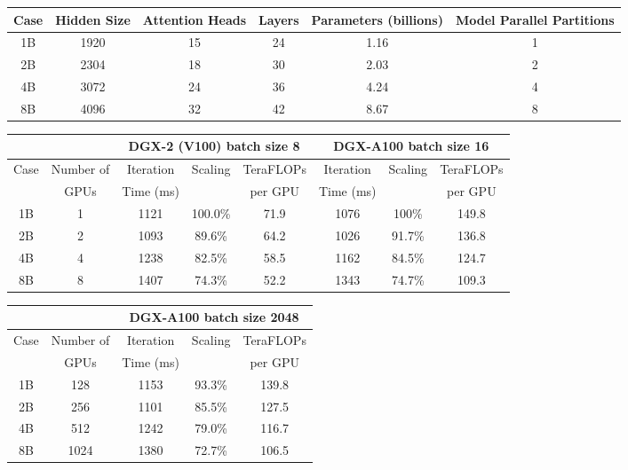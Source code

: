 \documentclass[multi,convert]{standalone}
\begin{document}
\begin{tabular}{cccccc}
  Case & Hidden Size & Attention Heads & Layers & Parameters (billions) & Model Parallel Partitions \\
  \hline
  1B & 1920 & 15 & 24 & 1.16 & 1 \\
  2B & 2304 & 18 & 30 & 2.03 & 2 \\
  4B & 3072 & 24 & 36 & 4.24 & 4 \\
  8B & 4096 & 32 & 42 & 8.67 & 8 \\
\end{tabular}

\begin{tabular}{cc|ccc|ccc}
  & & \multicolumn{3}{c|}{\textbf{DGX-2 (V100) batch size 8}} & \multicolumn{3}{c}{\textbf{DGX-A100 batch size 16}} \\
  \hline
  \multirow{2}{*}{Case} & Number of & Iteration & \multirow{2}{*}{Scaling} & TeraFLOPs & Iteration & \multirow{2}{*}{Scaling} & TeraFLOPs \\
                        & GPUs      & Time (ms) &                          & per GPU   & Time (ms) &                          & per GPU \\
  \hline
  1B & 1 & 1121 & 100.0\% & 71.9 & 1076 & 100\%  & 149.8 \\
  2B & 2 & 1093 & 89.6\%  & 64.2 & 1026 & 91.7\% & 136.8 \\
  4B & 4 & 1238 & 82.5\%  & 58.5 & 1162 & 84.5\% & 124.7 \\
  8B & 8 & 1407 & 74.3\%  & 52.2 & 1343 & 74.7\% & 109.3 \\
\end{tabular}

\begin{tabular}{cc|ccc}
  & & \multicolumn{3}{c}{\textbf{DGX-A100 batch size 2048}} \\
  \hline
  \multirow{2}{*}{Case} & Number of & Iteration & \multirow{2}{*}{Scaling} & TeraFLOPs \\
                        & GPUs      & Time (ms) &                          & per GPU   \\
  \hline
  1B & 128  & 1153 & 93.3\% & 139.8 \\
  2B & 256  & 1101 & 85.5\% & 127.5 \\
  4B & 512  & 1242 & 79.0\% & 116.7 \\
  8B & 1024 & 1380 & 72.7\% & 106.5 \\
\end{tabular}
\end{document}
